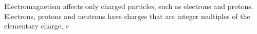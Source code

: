 Electromagnetism affects only charged particles, such as electrons and protons. Electrons, protons and neutrons have charges that are integer multiples of the elementary charge, $e$